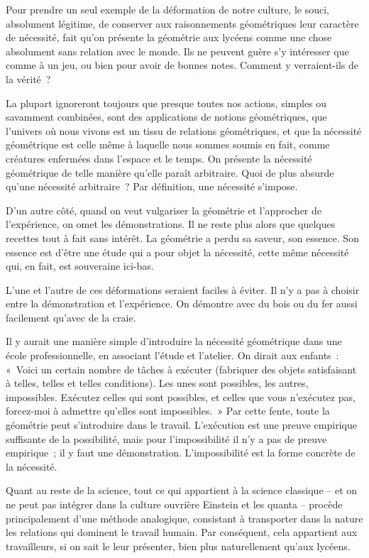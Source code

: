 \documentclass[french,twoside]{book} %
\begin{document}
Pour prendre un seul exemple de la déformation de notre culture, le souci, absolument légitime, de conserver aux raisonnements géométriques leur caractère de nécessité, fait qu'on présente la géométrie aux lycéens comme une chose absolument sans relation avec le monde. Ils ne peuvent guère s'y intéresser que comme à un jeu, ou bien pour avoir de bonnes notes. Comment y verraient-ils de la vérité ?\par
La plupart ignoreront toujours que presque toutes nos actions, simples ou savamment combinées, sont des applications de notions géométriques, que l'univers où nous vivons est un tissu de relations géométriques, et que la nécessité géométrique est celle même à laquelle nous sommes soumis en fait, comme créatures enfermées dans l'espace et le temps. On présente la nécessité géométrique de telle manière qu'elle paraît arbitraire. Quoi de plus absurde qu'une nécessité arbitraire ? Par définition, une nécessité s'impose.\par
D'un autre côté, quand on veut vulgariser la géométrie et l'approcher de l'expérience, on omet les démonstrations. Il ne reste plus alors que quelques recettes tout à fait sans intérêt. La géométrie a perdu sa saveur, son essence. Son essence est d'être une étude qui a pour objet la nécessité, cette même nécessité qui, en fait, est souveraine ici-bas.\par
L'une et l'autre de ces déformations seraient faciles à éviter. Il n'y a pas à choisir entre la démonstration et l'expérience. On démontre avec du bois ou du fer aussi facilement qu'avec de la craie.\par
Il y aurait une manière simple d'introduire la nécessité géométrique dans une école professionnelle, en associant l'étude et l'atelier. On dirait aux enfants : « Voici un certain nombre de tâches à exécuter (fabriquer des objets satisfaisant à telles, telles et telles conditions). Les unes sont possibles, les autres, impossibles. Exécutez celles qui sont possibles, et celles que vous n'exécutez pas, forcez-moi à admettre qu'elles sont impossibles. » Par cette fente, toute la géométrie peut s'introduire dans le travail. L'exécution est une preuve empirique suffisante de la possibilité, mais pour l'impossibilité il n'y a pas de preuve empirique ; il y faut une démonstration. L'impossibilité est la forme concrète de la nécessité.\par
Quant au reste de la science, tout ce qui appartient à la science classique – et on ne peut pas intégrer dans la culture ouvrière Einstein et les quanta – procède principalement d'une méthode analogique, consistant à transporter dans la nature les relations qui dominent le travail humain. Par conséquent, cela appartient aux travailleurs, si on sait le leur présenter, bien plus naturellement qu'aux lycéens.\par
\end{document}
